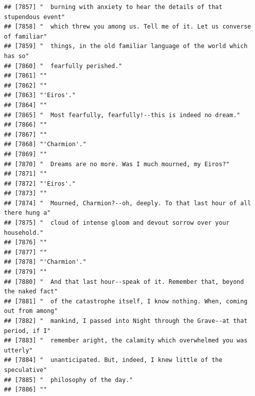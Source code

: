 \documentclass{article}\usepackage[]{graphicx}\usepackage[]{color}
\makeatletter
\newenvironment{kframe}{%
 \def\at@end@of@kframe{}%
 \ifinner\ifhmode%
  \def\at@end@of@kframe{\end{minipage}}%
  \begin{minipage}{\columnwidth}%
 \fi\fi%
 \def\FrameCommand##1{\hskip\@totalleftmargin \hskip-\fboxsep
 \colorbox{shadecolor}{##1}\hskip-\fboxsep
     \hskip-\linewidth \hskip-\@totalleftmargin \hskip\columnwidth}%
 \MakeFramed {\advance\hsize-\width
   \@totalleftmargin\z@ \linewidth\hsize
   \@setminipage}}%
 {\par\unskip\endMakeFramed%
 \at@end@of@kframe}
\newenvironment{knitrout}{}{} %
\makeatother
\begin{document}
\begin{knitrout}
\begin{kframe}
\begin{verbatim}
## [7857] "  burning with anxiety to hear the details of that stupendous event"         
## [7858] "  which threw you among us. Tell me of it. Let us converse of familiar"      
## [7859] "  things, in the old familiar language of the world which has so"            
## [7860] "  fearfully perished."                                                       
## [7861] ""                                                                            
## [7862] ""                                                                            
## [7863] "'Eiros'."                                                                    
## [7864] ""                                                                            
## [7865] "  Most fearfully, fearfully!--this is indeed no dream."                      
## [7866] ""                                                                            
## [7867] ""                                                                            
## [7868] "'Charmion'."                                                                 
## [7869] ""                                                                            
## [7870] "  Dreams are no more. Was I much mourned, my Eiros?"                         
## [7871] ""                                                                            
## [7872] "'Eiros'."                                                                    
## [7873] ""                                                                            
## [7874] "  Mourned, Charmion?--oh, deeply. To that last hour of all there hung a"     
## [7875] "  cloud of intense gloom and devout sorrow over your household."             
## [7876] ""                                                                            
## [7877] ""                                                                            
## [7878] "'Charmion'."                                                                 
## [7879] ""                                                                            
## [7880] "  And that last hour--speak of it. Remember that, beyond the naked fact"     
## [7881] "  of the catastrophe itself, I know nothing. When, coming out from among"    
## [7882] "  mankind, I passed into Night through the Grave--at that period, if I"      
## [7883] "  remember aright, the calamity which overwhelmed you was utterly"           
## [7884] "  unanticipated. But, indeed, I knew little of the speculative"              
## [7885] "  philosophy of the day."                                                    
## [7886] ""                                                                            

\end{verbatim}
\end{kframe}
\end{knitrout}
\end{document}
